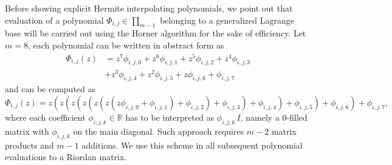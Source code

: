 
Before showing explicit Hermite interpolating polynomials, we point out that
evaluation of a polynomial $\Phi_{i,j}\in\prod_{m-1}$ belonging to a
generalized Lagrange base will be carried out using the Horner algorithm for
the sake of efficiency. Let $m=8$, each polynomial can be written in abstract
form as
\begin{displaymath}
\begin{split}
\Phi_{i,j}{\left (z \right )} &= z^{7} \phi_{i,j,0} + z^{6} \phi_{i,j,1} + z^{5} \phi_{i,j,2} + z^{4} \phi_{i,j,3} \\
    &+ z^{3} \phi_{i,j,4} + z^{2} \phi_{i,j,5} + z \phi_{i,j,6} + \phi_{i,j,7}
\end{split}
\end{displaymath}
and can be computed as
\begin{displaymath}
\Phi_{i,j}{\left (z \right )} = z \left(z \left(z \left(z \left(z \left(z \left(z \phi_{i,j,0} + \phi_{i,j,1}\right) + \phi_{i,j,2}\right) + \phi_{i,j,3}\right) + \phi_{i,j,4}\right) + \phi_{i,j,5}\right) + \phi_{i,j,6}\right) + \phi_{i,j,7},
\end{displaymath}
where each coefficient $\phi_{i,j,k}\in\mathbb{R}$ has to be interpreted as
$\phi_{i,j,k}\,I$, namely a $0$-filled matrix with $\phi_{i,j,k}$ on the main
diagonal. Such approach requires $m-2$ matrix products and $m-1$ additions.  We
use this scheme in all subsequent polynomial evaluations to a Riordan matrix.

